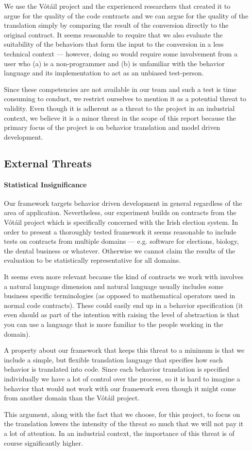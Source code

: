 We use the V\'{o}t\'{a}il project and the experienced researchers that created it to argue for the quality of the code contracts and we can argue for the quality of the translation simply by comparing the result of the conversion directly to the original contract. It seems reasonable to require that we also evaluate the suitability of the behaviors that form the input to the conversion in a less technical context --- however, doing so would require some involvement from a user who (a) is a non-programmer and (b) is unfamiliar with the behavior language and its implementation to act as an unbiased test-person.

Since these competencies are not available in our team and such a test is time consuming to conduct, we restrict ourselves to mention it as a potential threat to validity. Even though it is adherent as a threat to the project in an industrial context, we believe it is a minor threat in the scope of this report because the primary focus of the project is on behavior translation and model driven development.

\subsection{External Threats}
\paragraph{Statistical Insignificance}
Our framework targets behavior driven development in general regardless of the area of application. Nevertheless, our experiment builds on contracts from the V\'{o}t\'{a}il project which is specifically concerned with the Irish election system. In order to present a thoroughly tested framework it seems reasonable to include tests on contracts from multiple domains --- e.g. software for elections, biology, the dental business or whatever. Otherwise we cannot claim the results of the evaluation to be statistically representative for all domains.
 
It seems even more relevant because the kind of contracts we work with involves a natural language dimension and natural language usually includes some business specific terminologies (as opposed to mathematical operators used in normal code contracts). These could easily end up in a behavior specification (it even should as part of the intention with raising the level of abstraction is that you can use a language that is more familiar to the people working in the domain).
 
A property about our framework that keeps this threat to a minimum is that we include a simple, but flexible translation language that specifies how each behavior is translated into code. Since each behavior translation is specified individually we have a lot of control over the process, so it is hard to imagine a behavior that would not work with our framework even though it might come from another domain than the V\'{o}t\'{a}il project.
 
This argument, along with the fact that we choose, for this project, to focus on the translation lowers the intensity of the threat so much that we will not pay it a lot of attention. In an industrial context, the importance of this threat is of course significantly higher.